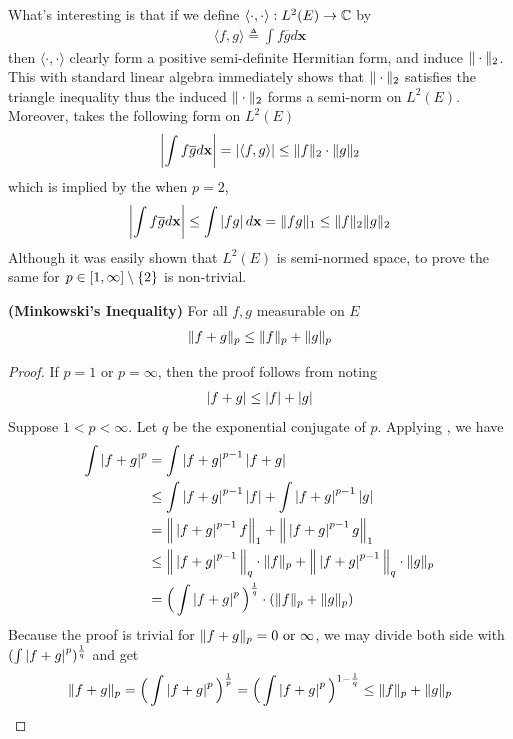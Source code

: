 \documentclass{report}
\begin{document}
\begin{mdframed}
What's interesting is that if we define $\langle \cdot , \cdot\rangle :L^2(E)\rightarrow \mathbb{C}$ by 
\begin{align*}
\langle f,g\rangle \triangleq \int f \overline{g}d\textbf{x}
\end{align*}
then $\langle \cdot, \cdot \rangle $ clearly form a positive semi-definite Hermitian form, and induce $\| \cdot \|_2$. This with standard linear algebra immediately shows that $\| \cdot \|_2$ satisfies the triangle inequality thus the induced $\| \cdot \|_2$ forms a semi-norm on $L^2(E)$. Moreover,  takes the following form on $L^2(E)$ 
\begin{align*}
 \left|\int f \overline{g}d\textbf{x}\right|=\left|\langle f,g\rangle \right|\leq \| f \|_2 \cdot \| g \|_2 
\end{align*}
which is implied by the   when $p=2$, 
\begin{align*}
\left|\int f \overline{g}d\textbf{x}\right| \leq \int \left|fg\right|d \textbf{x} = \| fg \|_1 \leq \| f \|_2 \| g \|_2 
\end{align*}
Although it was easily shown that $L^2(E)$ is semi-normed space, to prove the same for $p \in [1,\infty]\setminus \{ 2 \}$ is non-trivial.   
\end{mdframed}
\begin{theorem}
\label{MI}
\textbf{(Minkowski's Inequality)} For all $f,g$ measurable on  $E$  
\begin{align*}
\| f+g \|_p \leq \| f \|_p + \| g \|_p
\end{align*}
\end{theorem}
\begin{proof}
If $p=1$ or  $p=\infty$, then the proof follows from noting 
\begin{align*}
\left|f+g\right|\leq \left|f\right|+ \left|g\right|
\end{align*}
Suppose $1< p < \infty$. Let $q$ be the exponential conjugate of  $p$. Applying , we have 
\begin{align*}
\int \left|f+g\right|^{p} &= \int \left|f+g\right|^{p-1} \left|f+g\right| \\
&\leq \int \left|f+g\right|^{p-1} \left|f\right| + \int \left|f+g\right|^{p-1} \left|g\right| \\
&= \Big\| \left|f+g\right|^{p-1}f \Big\|_1 + \Big\| \left|f+g\right|^{p-1}g \Big\|_1 \\
&\leq \Big\| \left|f+g\right|^{p-1} \Big\|_q \cdot \| f \|_p + \Big\| \left|f+g\right|^{p-1} \Big\|_q \cdot \| g \|_p \\
&= \Big(\int \left|f+g\right|^{p} \Big)^{\frac{1}{q}} \cdot (\| f \|_p + \| g \|_p)
\end{align*}
Because the proof is trivial for $\| f+g \|_p=0\text{ or }\infty$, we may  divide both side with $(\int \left|f+g\right|^{p})^{\frac{1}{q}}$ and get 
\begin{align*}
\| f+g \|_p=\Big( \int \left|f+g\right|^p \Big)^{\frac{1}{p}}= \Big( \int \left|f+g\right|^p \Big)^{1- \frac{1}{q}}\leq \| f \|_p + \| g \|_p
\end{align*}
\end{proof}
\end{document}
